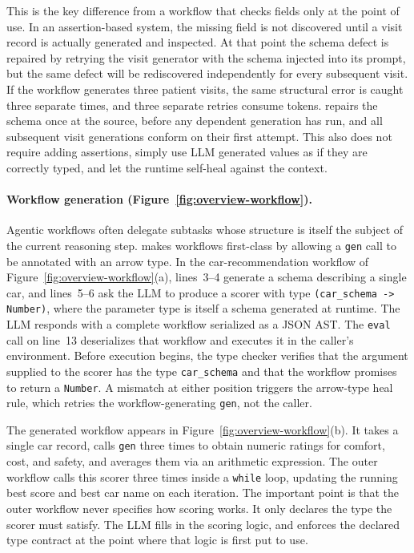 This is the key difference from a workflow that checks fields only 
at the point of use. In an assertion-based system, the missing 
field is not discovered until a visit record is actually generated 
and inspected. At that point the schema defect is repaired by 
retrying the visit generator with the schema injected into its 
prompt, but the same defect will be rediscovered independently for 
every subsequent visit. If the workflow generates three patient 
visits, the same structural error is caught three separate times, 
and three separate retries consume tokens. \pact repairs the 
schema once at the source, before any dependent generation has 
run, and all subsequent visit generations conform on their first 
attempt. This also does not require adding assertions, simply
use LLM generated values as if they are correctly typed, and let the runtime
self-heal against the context.

\paragraph{Workflow generation (Figure~\ref{fig:overview-workflow}).}
Agentic workflows often delegate subtasks whose structure is 
itself the subject of the current reasoning step. \pact makes 
workflows first-class by allowing a \texttt{gen} call to be 
annotated with an arrow type. In the car-recommendation workflow 
of Figure~\ref{fig:overview-workflow}(a), lines~3--4 generate a 
schema describing a single car, and lines~5--6 ask the LLM to 
produce a scorer with type \texttt{(car\_schema -> Number)}, where 
the parameter type is itself a schema generated at runtime. The 
LLM responds with a complete \pact workflow serialized as a JSON 
AST. The \texttt{eval} call on line~13 deserializes that workflow 
and executes it in the caller's environment. Before execution 
begins, the type checker verifies that the argument supplied to 
the scorer has the type \texttt{car\_schema} and that the workflow 
promises to return a \texttt{Number}. A mismatch at either 
position triggers the arrow-type heal rule, which retries the 
workflow-generating \texttt{gen}, not the caller.

The generated workflow appears in Figure~\ref{fig:overview-workflow}(b). 
It takes a single car record, calls \texttt{gen} three times to 
obtain numeric ratings for comfort, cost, and safety, and averages 
them via an arithmetic expression. The outer workflow calls this 
scorer three times inside a \texttt{while} loop, updating the 
running best score and best car name on each iteration. The 
important point is that the outer workflow never specifies how 
scoring works. It only declares the type the scorer must satisfy. 
The LLM fills in the scoring logic, and \pact enforces the 
declared type contract at the point where that logic is first put 
to use.